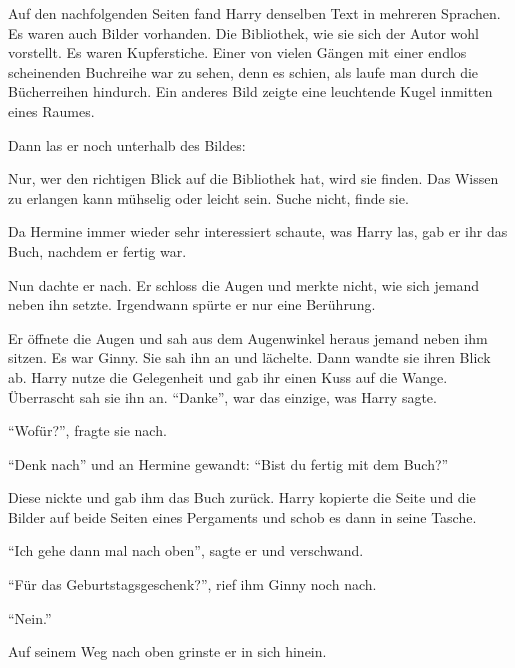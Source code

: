 Auf den nachfolgenden Seiten fand Harry denselben Text in mehreren Sprachen. Es waren auch Bilder vorhanden. Die Bibliothek, wie sie sich der Autor wohl vorstellt. Es waren Kupferstiche. Einer von vielen Gängen mit einer endlos scheinenden Buchreihe war zu sehen, denn es schien, als laufe man durch die Bücherreihen hindurch. Ein anderes Bild zeigte eine leuchtende Kugel inmitten eines Raumes.

Dann las er noch unterhalb des Bildes:

\begin{buch}
Nur, wer den richtigen Blick auf die Bibliothek hat, wird sie finden. Das Wissen zu erlangen kann mühselig oder leicht sein. Suche nicht, finde sie.
\end{buch}

Da Hermine immer wieder sehr interessiert schaute, was Harry las, gab er ihr das Buch, nachdem er fertig war.

Nun dachte er nach. Er schloss die Augen und merkte nicht, wie sich jemand neben ihn setzte. Irgendwann spürte er nur eine Berührung. 

Er öffnete die Augen und sah aus dem Augenwinkel heraus jemand neben ihm sitzen. Es war Ginny. Sie sah ihn an und lächelte. Dann wandte sie ihren Blick ab. Harry nutze die Gelegenheit und gab ihr einen Kuss auf die Wange. Überrascht sah sie ihn an.  \enquote{Danke}, war das einzige, was Harry sagte.

\enquote{Wofür?}, fragte sie nach.

\enquote{Denk nach} und an Hermine gewandt: \enquote{Bist du fertig mit dem Buch?}

Diese nickte und gab ihm das Buch zurück. Harry kopierte die Seite und die Bilder auf beide Seiten eines Pergaments und schob es dann in seine Tasche.

\enquote{Ich gehe dann mal nach oben}, sagte er und verschwand.

\enquote{Für das Geburtstagsgeschenk?}, rief ihm Ginny noch nach.

\enquote{Nein.}

Auf seinem Weg nach oben grinste er in sich hinein. 

